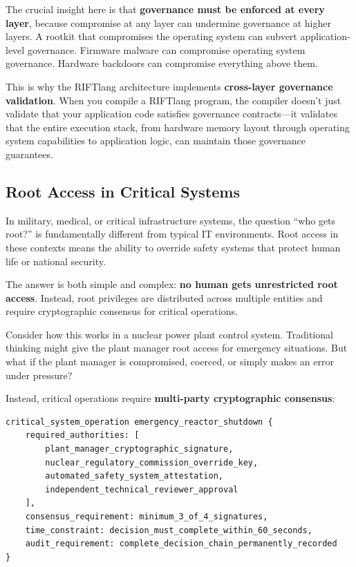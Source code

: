 The crucial insight here is that \textbf{governance must be enforced at every layer}, because compromise at any layer can undermine governance at higher layers. A rootkit that compromises the operating system can subvert application-level governance. Firmware malware can compromise operating system governance. Hardware backdoors can compromise everything above them.

This is why the RIFTlang architecture implements \textbf{cross-layer governance validation}. When you compile a RIFTlang program, the compiler doesn't just validate that your application code satisfies governance contracts—it validates that the entire execution stack, from hardware memory layout through operating system capabilities to application logic, can maintain those governance guarantees.

\subsection{Root Access in Critical Systems}

In military, medical, or critical infrastructure systems, the question ``who gets root?'' is fundamentally different from typical IT environments. Root access in these contexts means the ability to override safety systems that protect human life or national security.

The answer is both simple and complex: \textbf{no human gets unrestricted root access}. Instead, root privileges are distributed across multiple entities and require cryptographic consensus for critical operations.

Consider how this works in a nuclear power plant control system. Traditional thinking might give the plant manager root access for emergency situations. But what if the plant manager is compromised, coerced, or simply makes an error under pressure?

Instead, critical operations require \textbf{multi-party cryptographic consensus}:

\begin{lstlisting}[language=rift]
critical_system_operation emergency_reactor_shutdown {
    required_authorities: [
        plant_manager_cryptographic_signature,
        nuclear_regulatory_commission_override_key,
        automated_safety_system_attestation,
        independent_technical_reviewer_approval
    ],
    consensus_requirement: minimum_3_of_4_signatures,
    time_constraint: decision_must_complete_within_60_seconds,
    audit_requirement: complete_decision_chain_permanently_recorded
}
\end{lstlisting}

